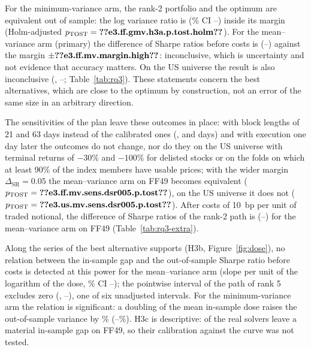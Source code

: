 For the minimum-variance arm, the rank-2 portfolio and the optimum are equivalent out of sample: the log variance
ratio is  (\% CI --)
inside its margin (Holm-adjusted $p_{\mathrm{TOST}} = \res{e3.ff.gmv.h3a.p.tost.holm}$). For the mean--variance arm
(primary) the difference of Sharpe ratios before costs is 
(--) against the margin $\pm\res{e3.ff.mv.margin.high}$:
inconclusive, which is uncertainty and not evidence that accuracy matters. On the US universe the result is also
inconclusive (, --; Table~\ref{tab:rq3}). These
statements concern the best alternatives, which are close to the optimum by construction, not an error of the same size
in an arbitrary direction.

The sensitivities of the plan leave these outcomes in place: with block lengths of 21 and 63 days instead of the
calibrated ones (,  and  days) and with execution one day
later the outcomes do not change, nor do they on the US universe with terminal returns of $-30\%$ and $-100\%$ for %
delisted stocks or on the  folds on which at least 90\% of the index members have %
usable prices; with the wider margin $\Delta_{\mathrm{SR}} = 0.05$ the mean--variance arm on FF49 %
becomes equivalent ($p_{\mathrm{TOST}} = \res{e3.ff.mv.sens.dsr005.p.tost}$), on the US universe it does not
($p_{\mathrm{TOST}} = \res{e3.us.mv.sens.dsr005.p.tost}$). After costs of 10~bp per unit of traded notional, the %
difference of Sharpe ratios of the rank-2 path is 
(--) for the mean--variance arm on FF49
(Table~\ref{tab:rq3-extra}).

Along the series of the best alternative supports (H3b, Figure~\ref{fig:dose}), no relation between the in-sample
gap and the out-of-sample Sharpe ratio before costs is detected at this power for the mean--variance arm (slope
 per unit of the logarithm of the dose, \% CI
--); the pointwise interval of the path of rank 5
excludes zero (, --), one of six
unadjusted intervals. For the minimum-variance arm the relation is significant: a doubling of the mean in-sample dose
raises the out-of-sample variance by \%
(--\%). H3c is descriptive:
 of the  real solvers leave a material in-sample gap on FF49,
so their calibration against the curve was not tested.

